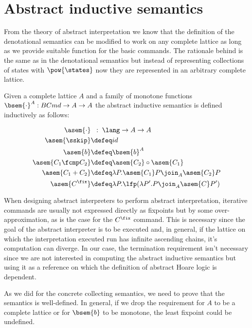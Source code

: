 \section{Abstract inductive semantics}

From the theory of abstract interpretation we know that the definition of the
denotational semantics can be modified to work on any complete lattice as long
as we provide suitable function for the basic commands. The rationale
behind is the same as in the denotational semantics but instead of representing
collections of states with $\pow{\states}$ now they are represented in an
arbitrary complete lattice.

\begin{definition}

  \label{def:abstract-inductive-semantics}
  Given a complete lattice $A$ and a family of monotone functions $\bsem{\cdot}^A : 
  BCmd \to A \to A$ the abstract inductive semantics is defined inductively as 
  follows:

  \begin{align*}
      \asem{\cdot}         & \;\;:\; \lang \to A \to A \\
      \asem{\sskip}         &\defeq id \\
      \asem{b}             &\defeq \bsem{b}^A \\
      \asem{C_1 \fcmp C_2} &\defeq \asem{C_2} \circ \asem{C_1} \\
      \asem{C_1 + C_2}     &\defeq \lambda P . \asem{C_1} P \join_A \asem{C_2} P \\
      \asem{C^\fix}        &\defeq \lambda P . \lfp(\lambda P'. P \join_A \asem{C} P')
  \end{align*}
\end{definition}


When designing abstract interpreters to perform abstract interpretation,
iterative commands are usually not expressed directly as fixpoints but by
some over-approximation, as is the case for the $C^\fix$ command. This is
necessary since the goal of the abstract interpreter is to be executed and, in
general, if the lattice on which the interpretation executed run has infinite
ascending chains, it's computation can diverge. In our case, the termination
requirement isn't necessary since we are not interested in computing the abstract
inductive semantics but using it as a reference on which the definition of
abstract Hoare logic is dependent.


As we did for the concrete collecting semantics, we need to prove that the
semantics is well-defined. In general, if we drop the requirement for $A$
to be a complete lattice or for $\bsem{b}$ to be monotone, the least fixpoint
could be undefined.

